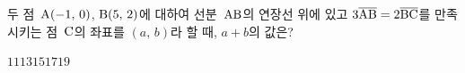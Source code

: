 두 점~$\mathrm{A}(-1,\,0)$, $\mathrm{B}(5,\,2)$에 대하여 선분~$\mathrm{AB}$의 연장선 위에 있고 $3\overline{\mathrm{AB}}=2\overline{\mathrm{BC}}$를 만족시키는 점~$\mathrm{C}$의 좌표를 $(a,\,b)$라 할 때, $a+b$의 값은? 
\begin{choices32}{$11$}{$13$}{$15$}{$17$}{$19$}\end{choices32}
